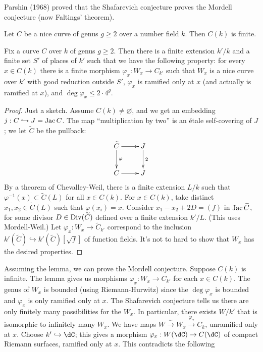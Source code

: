 Parshin (1968) proved that the Shafarevich conjecture proves the Mordell 
conjecture (now Faltings' theorem). 

\begin{conjecture}[Mordell]
Let $C$ be a nice curve of genus $g\geqslant 2$ over a number field $k$. Then 
$C(k)$ is finite. 
\end{conjecture}

\begin{lemma}[technical]
Fix a curve $C$ over $k$ of genus $g\geqslant 2$. Then there is a finite 
extension $k'/k$ and a finite set $S'$ of places of $k'$ such that we have the 
following property: for every $x\in C(k)$ there is a finite morphism 
$\varphi_x:W_x \to C_{k'}$ such that $W_x$ is a nice curve over $k'$ with good 
reduction outside $S'$, $\varphi_x$ is ramified only at $x$ (and actually is 
ramified at $x$), and $\deg\varphi_x \leqslant 2\cdot 4^g$. 
\end{lemma}
\begin{proof}
Just a sketch. Assume $C(k)\ne \varnothing$, and we get an embedding 
$j:C\hookrightarrow J=\operatorname{Jac} C$. The map ``multiplication by two'' is an 
\'etale self-covering of $J$; we let $\widetilde C$ be the pullback: 
\[\xymatrix{
  \widetilde C \ar[r] \ar[d]^-\varphi 
    & J \ar[d]^-2 \\
  C \ar[r] 
    & J 
}\]
By a theorem of Chevalley-Weil, there is a finite extension $L/k$ such that 
$\varphi^{-1}(x)\subset \widetilde C(L)$ for all $x\in C(k)$. For 
$x\in C(k)$, take distinct $x_1,x_2\in \widetilde C(L)$ such that 
$\varphi(x_i)=x$. Consider $x_1-x_2+2 D=(f)$ in $\operatorname{Jac}{\widetilde C}$, for 
some divisor $D\in \operatorname{Div}(\widetilde C)$ defined over a finite extension 
$k'/L$. (This uses Mordell-Weil.) Let 
$\varphi_x:W_x \to \widetilde C_{k'}$ correspond to the inclusion 
$k'(\widetilde C)\hookrightarrow k'(\widetilde C)[\sqrt f]$ of function 
fields. It's not to hard to show that $W_x$ has the desired properties. 
\end{proof}

Assuming the lemma, we can prove the Mordell conjecture. Suppose $C(k)$ is 
infinite. The lemma gives us morphisms $\varphi_x:W_x \to C_{k'}$ for each 
$x\in C(k)$. The genus of $W_x$ is bounded (using Riemann-Hurwitz) since the 
$\deg\varphi_x$ is bounded and $\varphi_x$ is only ramified only at $x$. 
The Shafarevich conjecture tells us there are only finitely many possibilities 
for the $W_x$. In particular, there exists $W/k'$ that is isomorphic to 
infinitely many $W_x$. We have maps 
$W\xrightarrow\sim W_x \xrightarrow{\varphi_x} C_k$, unramified only at $x$. 
Choose $k'\hookrightarrow\dC$; this gives a morphism 
$\varphi_x:W(\dC) \to C(\dC)$ of compact Riemann surfaces, ramified only at 
$x$. This contradicts the following 

